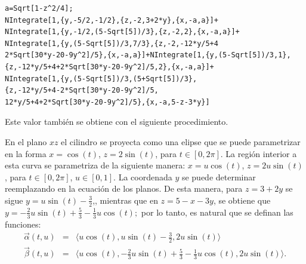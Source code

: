 \begin{tcolorbox}[title=\bf Instrucción en \verb"Mathematica"]\begin{Verbatim}[formatcom=\letraverbatim]
a=Sqrt[1-z^2/4];
NIntegrate[1,{y,-5/2,-1/2},{z,-2,3+2*y},{x,-a,a}]+
NIntegrate[1,{y,-1/2,(5-Sqrt[5])/3},{z,-2,2},{x,-a,a}]+
NIntegrate[1,{y,(5-Sqrt[5])/3,7/3},{z,-2,-12*y/5+4
2*Sqrt[30*y-20-9y^2]/5},{x,-a,a}]+NIntegrate[1,{y,(5-Sqrt[5])/3,1},
{z,-12*y/5+4+2*Sqrt[30*y-20-9y^2]/5,2},{x,-a,a}]+
NIntegrate[1,{y,(5-Sqrt[5])/3,(5+Sqrt[5])/3},
{z,-12*y/5+4-2*Sqrt[30*y-20-9y^2]/5,
12*y/5+4+2*Sqrt[30*y-20-9y^2]/5},{x,-a,5-z-3*y}]
\end{Verbatim}
\end{tcolorbox}

Este valor también se obtiene con el siguiente procedimiento.


En el plano $xz$ el cilindro se proyecta como una elipse que se puede parametrizar en la forma
$x=\cos(t)$, $z=2\sin (t)$, para $t\in [0,2\pi ]$.
La región interior a esta curva se parametriza de la siguiente manera: $x = u \cos(t)$, $z = 2u\sin(t)$, para
$t\in[0, 2\pi]$, $u\in[0, 1]$. La coordenada $y$ se puede determinar reemplazando en la ecuación de los planos.
De esta manera, para $z=3+2y$ se sigue $y = u\sin(t)-\frac{3}{2}$,, mientras que en
$z = 5-x-3y$, se obtiene que $y = -\frac{2}{3}u\sin(t)+\frac{5}{3}-\frac{1}{3}u \cos(t);$ por lo tanto, es natural que se definan las funciones:
{\small
\begin{eqnarray*}
\overrightarrow{\alpha}(t,u)&=&\langle u \cos(t), u\sin(t)-\frac{3}{2},2u\sin(t)\rangle \\
\overrightarrow{\beta}(t,u) &=& \langle u \cos(t),-\frac{2}{3}u\sin(t)+\frac{5}{3}-\frac{1}{3}u \cos(t) ,2u\sin(t)\rangle.
\end{eqnarray*}
}


